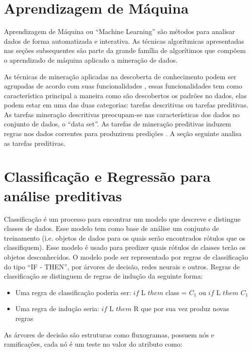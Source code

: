 \pagebreak

\section{Aprendizagem de Máquina}\label{arte:palavraChave:Machine}

Aprendizagem de Máquina ou ``Machine Learning'' são métodos para analisar dados de forma automatizada e interativa.
As técnicas algorítmicas apresentadas nas seções subsequentes são parte da grande família de algorítimos que compõem 
o aprendizado de máquina aplicado a mineração de dados.

As técnicas de mineração aplicadas na descoberta de conhecimento podem ser agrupadas de acordo com suas funcionalidades \cite{DataMining2}, 
essas funcionalidades tem como característica principal a maneira como são descobertos os padrões no dados, elas podem estar 
em uma das duas categorias: tarefas descritivas ou tarefas preditivas. As tarefas mineração descritivas preocupam-se nas características 
dos dados no conjunto de dados, o ``data set''. As tarefas de mineração preditivas induzem regras nos dados correntes para produzirem 
predições \cite{DataMining2}. A seção seguinte analisa as tarefas preditivas.

\section{Classificação e Regressão para análise preditivas}

Classificação é um processo para encontrar um modelo que descreve e distingue classes de dados. 
Esse modelo tem como base de análise um conjunto de treinamento (i.e. objetos de dados para os quais 
serão encontrados rótulos que os classifiquem). 
Esse modelo é usado para predizer quais rótulos de classes terão os objetos desconhecidos.
O modelo pode ser representado por regras de classificação do tipo ``IF - THEN'', por árvores de decisão, redes neurais e outros. 
Regras de classificação se distinguem de regras de indução da seguinte forma:
\begin{itemize}
 \item Uma regra de classificação poderia ser: $if$ L $them$ class = $C_{1}$ ou $if$ L $them$  $C_{1}$
 \item Uma regra de indução seria: $ if$ L $them$ R que por sua vez produz novas regras 
\end{itemize}

As árvores de decisão são estruturas como fluxogramas, possuem nós e ramificações, 
cada nó é um teste no valor do atributo como:
\singlespace

